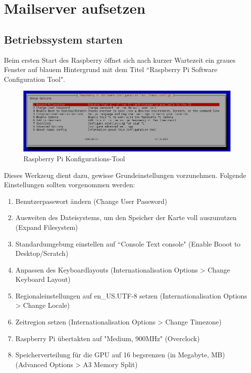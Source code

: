 \section{Mailserver aufsetzen} 

\subsection{Betriebssystem starten}
Beim ersten Start des Raspberry öffnet sich nach kurzer Wartezeit ein graues Fenster auf blauem Hintergrund mit dem Titel ``Raspberry Pi Software Configuration Tool". 

\begin{figure}[h]
\centering
\includegraphics[scale=0.5]{images/raspiconfig}
\caption{Raspberry Pi Konfigurations-Tool}
\end{figure}

Dieses Werkzeug dient dazu, gewisse Grundeinstellungen vorzunehmen. Folgende Einstellungen sollten vorgenommen werden: 

\begin{enumerate}
\item Benutzerpasswort ändern (Change User Password)
\item Ausweiten des Dateisystems, um den Speicher der Karte voll auszunutzen (Expand Filesystem)
\item Standardumgebung einstellen auf ``Console Text console" (Enable Booot to Desktop/Scratch)
\item Anpassen des Keyboardlayouts (Internationalisation Options > Change Keyboard Layout)
\item Regionaleinstellungen auf en\_US.UTF-8 setzen (Internationalisation Options > Change Locale)
\item Zeitregion setzen (Internationalisation Options > Change Timezone) 
\item Raspberry Pi übertakten auf "Medium, 900MHz" (Overclock)
\item Speicherverteilung für die GPU auf 16 begsrenzen (in Megabyte, MB) (Advanced Options > A3 Memory Split)
\end{enumerate}

